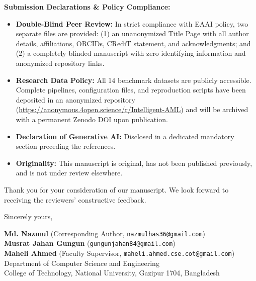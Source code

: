 \documentclass[11pt,a4paper]{article}
\begin{document}
\vspace{0.6em}
\noindent
\textbf{Submission Declarations \& Policy Compliance:}
\begin{itemize}[leftmargin=*,itemsep=2pt,topsep=2pt]
    \item \textbf{Double-Blind Peer Review:} In strict compliance with EAAI policy, two separate files are provided: (1) an unanonymized Title Page with all author details, affiliations, ORCIDs, CRediT statement, and acknowledgments; and (2) a completely blinded manuscript with zero identifying information and anonymized repository links.
    \item \textbf{Research Data Policy:} All 14 benchmark datasets are publicly accessible. Complete pipelines, configuration files, and reproduction scripts have been deposited in an anonymized repository (\url{https://anonymous.4open.science/r/Intelligent-AML}) and will be archived with a permanent Zenodo DOI upon publication.
    \item \textbf{Declaration of Generative AI:} Disclosed in a dedicated mandatory section preceding the references.
    \item \textbf{Originality:} This manuscript is original, has not been published previously, and is not under review elsewhere.
\end{itemize}

\vspace{0.8em}
\noindent
Thank you for your consideration of our manuscript. We look forward to receiving the reviewers' constructive feedback.

\vspace{1.2em}
\noindent
Sincerely yours,

\vspace{0.8em}
\noindent
\textbf{Md. Nazmul} (Corresponding Author, \texttt{nazmulhas36@gmail.com}) \\
\textbf{Musrat Jahan Gungun} (\texttt{gungunjahan84@gmail.com}) \\
\textbf{Maheli Ahmed} (Faculty Supervisor, \texttt{maheli.ahmed.cse.cot@gmail.com}) \\
Department of Computer Science and Engineering \\
College of Technology, National University, Gazipur 1704, Bangladesh
\end{document}
